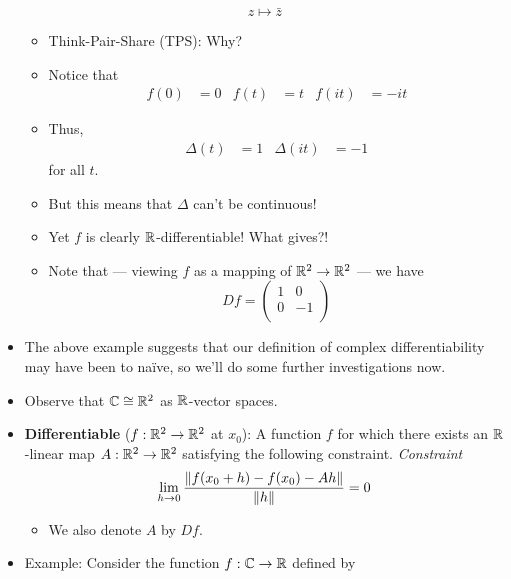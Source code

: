 \documentclass[../notes.tex]{subfiles}
\begin{document}
\begin{itemize}
\begin{equation*}
        z \mapsto \bar{z}
    \end{equation*}
    \begin{itemize}
        \item Think-Pair-Share (TPS): Why?
        \item Notice that
        \begin{align*}
            f(0) &= 0&
            f(t) &= t&
            f(it) &= -it
        \end{align*}
        \item Thus,
        \begin{align*}
            \Delta(t) &= 1&
            \Delta(it) &= -1
        \end{align*}
        for all $t$.
        \item But this means that $\Delta$ can't be continuous!
        \item Yet $f$ is clearly $\mathbb{R}$-differentiable! What gives?!
        \item Note that --- viewing $f$ as a mapping of $\mathbb{R}^2\to\mathbb{R}^2$ --- we have
        \begin{equation*}
            Df =
            \begin{pmatrix}
                1 & 0\\
                0 & -1\\
            \end{pmatrix}
        \end{equation*}
    \end{itemize}
    \item The above example suggests that our definition of complex differentiability may have been to na\"{i}ve, so we'll do some further investigations now.
    \item Observe that $\mathbb{C}\cong\mathbb{R}^2$ as $\mathbb{R}$-vector spaces.
    \item \textbf{Differentiable} ($f:\mathbb{R}^2\to\mathbb{R}^2$ at $x_0$): A function $f$ for which there exists an $\mathbb{R}$-linear map $A:\mathbb{R}^2\to\mathbb{R}^2$ satisfying the following constraint. \emph{Constraint}
    \begin{equation*}
        \lim_{h\to 0}\frac{\norm{f(x_0+h)-f(x_0)-Ah}}{\norm{h}} = 0
    \end{equation*}
    \begin{itemize}
        \item We also denote $A$ by $Df$.
    \end{itemize}
    \pagebreak
    \item Example: Consider the function $f:\mathbb{C}\to\mathbb{R}$ defined by
    \begin{equation*}

\end{equation*}
\end{itemize}
\end{document}
